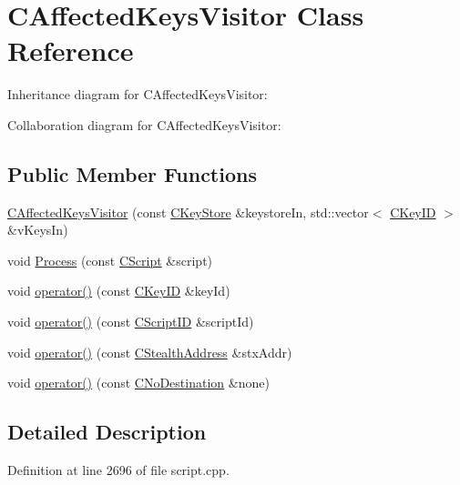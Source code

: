 \hypertarget{class_c_affected_keys_visitor}{}\section{C\+Affected\+Keys\+Visitor Class Reference}
\label{class_c_affected_keys_visitor}


Inheritance diagram for C\+Affected\+Keys\+Visitor\+:


Collaboration diagram for C\+Affected\+Keys\+Visitor\+:
\subsection*{Public Member Functions}
\begin{DoxyCompactItemize}
\item 
\hyperlink{class_c_affected_keys_visitor_a97f7f932abb21ae791993a284183ab89}{C\+Affected\+Keys\+Visitor} (const \hyperlink{class_c_key_store}{C\+Key\+Store} \&keystore\+In, std\+::vector$<$ \hyperlink{class_c_key_i_d}{C\+Key\+I\+D} $>$ \&v\+Keys\+In)
\item 
void \hyperlink{class_c_affected_keys_visitor_a749859ce2a826e2d60c8fe31685efae3}{Process} (const \hyperlink{class_c_script}{C\+Script} \&script)
\item 
void \hyperlink{class_c_affected_keys_visitor_abc13269c85eb964555cfe23c60b8c9b1}{operator()} (const \hyperlink{class_c_key_i_d}{C\+Key\+I\+D} \&key\+Id)
\item 
void \hyperlink{class_c_affected_keys_visitor_a01b52c5a4311ae3985d1e5753e033215}{operator()} (const \hyperlink{class_c_script_i_d}{C\+Script\+I\+D} \&script\+Id)
\item 
void \hyperlink{class_c_affected_keys_visitor_a34c60e9fafd77a10a30346b4f2ff1311}{operator()} (const \hyperlink{class_c_stealth_address}{C\+Stealth\+Address} \&stx\+Addr)
\item 
void \hyperlink{class_c_affected_keys_visitor_abeff400fed1ba87283930538f9164640}{operator()} (const \hyperlink{class_c_no_destination}{C\+No\+Destination} \&none)
\end{DoxyCompactItemize}


\subsection{Detailed Description}


Definition at line 2696 of file script.\+cpp.



